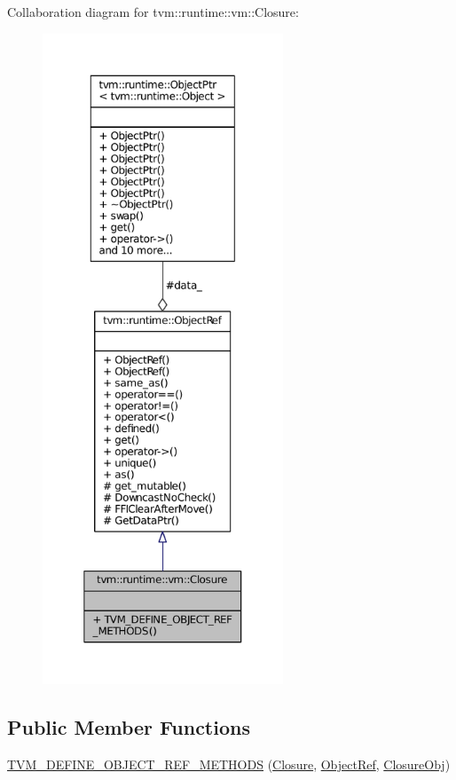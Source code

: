 Collaboration diagram for tvm\+:\+:runtime\+:\+:vm\+:\+:Closure\+:
\nopagebreak
\begin{figure}[H]
\begin{center}
\leavevmode
\includegraphics[height=550pt]{classtvm_1_1runtime_1_1vm_1_1Closure__coll__graph}
\end{center}
\end{figure}
\subsection*{Public Member Functions}
\begin{DoxyCompactItemize}
\item 
\hyperlink{classtvm_1_1runtime_1_1vm_1_1Closure_a8f94c9fd761ef8cf0917d5300e23bfe8}{T\+V\+M\+\_\+\+D\+E\+F\+I\+N\+E\+\_\+\+O\+B\+J\+E\+C\+T\+\_\+\+R\+E\+F\+\_\+\+M\+E\+T\+H\+O\+DS} (\hyperlink{classtvm_1_1runtime_1_1vm_1_1Closure}{Closure}, \hyperlink{classtvm_1_1runtime_1_1ObjectRef}{Object\+Ref}, \hyperlink{classtvm_1_1runtime_1_1vm_1_1ClosureObj}{Closure\+Obj})
\end{DoxyCompactItemize}
